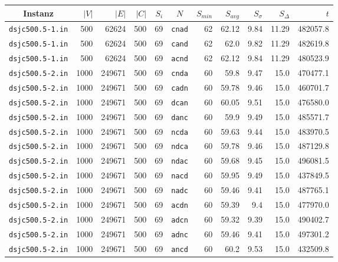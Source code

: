 \begin{table}[!htbp]
\centering
\begin{tabular}{c|rrr|r|c|rrr|r|r}
Instanz & $|V|$ & $|E|$ & $|C|$ & $S_i$ & $N$ & $S_{min}$ & $S_{avg}$ & $S_{\sigma}$ & $S_{\Delta}$ & $t$ \\
\hline\hline
\texttt{dsjc500.5-1.in}	& 500	& 62624	& 500	& 69	& \texttt{cnad}	& 62	& 62.12	& 9.84	& 11.29	& 482057.8\\
\texttt{dsjc500.5-1.in}	& 500	& 62624	& 500	& 69	& \texttt{cand}	& 62	& 62.0	& 9.82	& 11.29	& 482619.8\\
\texttt{dsjc500.5-1.in}	& 500	& 62624	& 500	& 69	& \texttt{acnd}	& 62	& 62.12	& 9.84	& 11.29	& 480523.9\\
\hline
\texttt{dsjc500.5-2.in}	& 1000	& 249671	& 500	& 69	& \texttt{cnda}	& 60	& 59.8	& 9.47	& 15.0	& 470477.1\\
\texttt{dsjc500.5-2.in}	& 1000	& 249671	& 500	& 69	& \texttt{cadn}	& 60	& 59.78	& 9.46	& 15.0	& 460701.7\\
\texttt{dsjc500.5-2.in}	& 1000	& 249671	& 500	& 69	& \texttt{dcan}	& 60	& 60.05	& 9.51	& 15.0	& 476580.0\\
\texttt{dsjc500.5-2.in}	& 1000	& 249671	& 500	& 69	& \texttt{danc}	& 60	& 59.9	& 9.49	& 15.0	& 485571.7\\
\texttt{dsjc500.5-2.in}	& 1000	& 249671	& 500	& 69	& \texttt{ncda}	& 60	& 59.63	& 9.44	& 15.0	& 483970.5\\
\texttt{dsjc500.5-2.in}	& 1000	& 249671	& 500	& 69	& \texttt{ndca}	& 60	& 59.78	& 9.46	& 15.0	& 487129.8\\
\texttt{dsjc500.5-2.in}	& 1000	& 249671	& 500	& 69	& \texttt{ndac}	& 60	& 59.68	& 9.45	& 15.0	& 496081.5\\
\texttt{dsjc500.5-2.in}	& 1000	& 249671	& 500	& 69	& \texttt{nacd}	& 60	& 59.95	& 9.49	& 15.0	& 437849.5\\
\texttt{dsjc500.5-2.in}	& 1000	& 249671	& 500	& 69	& \texttt{nadc}	& 60	& 59.46	& 9.41	& 15.0	& 487765.1\\
\texttt{dsjc500.5-2.in}	& 1000	& 249671	& 500	& 69	& \texttt{acdn}	& 60	& 59.39	& 9.4	& 15.0	& 477970.0\\
\texttt{dsjc500.5-2.in}	& 1000	& 249671	& 500	& 69	& \texttt{adcn}	& 60	& 59.32	& 9.39	& 15.0	& 490402.7\\
\texttt{dsjc500.5-2.in}	& 1000	& 249671	& 500	& 69	& \texttt{adnc}	& 60	& 59.46	& 9.41	& 15.0	& 497301.2\\
\texttt{dsjc500.5-2.in}	& 1000	& 249671	& 500	& 69	& \texttt{ancd}	& 60	& 60.2	& 9.53	& 15.0	& 432509.8\\

\end{tabular}
\end{table}
